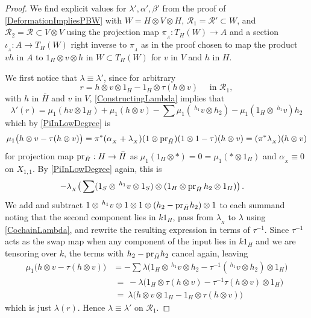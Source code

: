 \documentclass[11pt]{amsart}
\numberwithin{equation}{section}
\newcommand{\X}{_X}
\newcommand{\alphax}{\alpha_{\X}}
\newcommand{\lambdax}{\lambda_{\X}}
\newcommand{\pr}{ {\rm{pr}} }%
\newcommand{\R}{\mathcal{R}}
\newcommand{\RR}{\mathscr{R} }
\renewcommand{\_}[1]{\mbox{$_{\left( #1 \right)}$}}
\newcommand{\ot}{\otimes}
\begin{document}
{\begin{proof}
We find explicit values for $\lambda', \alpha', \beta'$
from the
proof of \cref{DeformationImpliesPBW}
with $W=H\ot V\ot H$, $\RR_1=\R'\subset W$,
and $\RR_2=\R\subset V\ot V$
using the projection map $\pi_{_A}:T_H(W)\rightarrow A$
and a section $\iota_{_A}: A\rightarrow T_H(W)$
right inverse to $\pi_{_A}$ as in the proof
chosen to map the product $vh$ in $A$ to $1_H\ot
v\ot h$ in $W\subset T_H(W)$
for $v$ in $V$ and $h$ in $H$.


We first notice that $\lambda\equiv \lambda'$, 
since for arbitrary
$$r=h\ot v\ot 1_H - 1_H\ot \tau(h\ot v) 
\quad\text{ in $\RR_1$},
$$
with $h$ in $\bar H$ and $v$ in $V$,
\cref{ConstructingLambda} 
implies that
$$\lambda'(r) = \mu_1(hv\ot 1_H)+\mu_1(h\ot v) 
-\sum \mu_1(\ ^{h_1}v\ot h_2)-\mu_1(1_H\ot \ ^{h_1}v)h_2$$
which by \cref{PiInLowDegree} is
$$
\begin{aligned}
\mu_1\big(h\ot v
-\tau(h\ot v)\big)
&=
\pi^*(\alphax+\lambdax)(1\ot \pr_{\bar H})(1\ot 1 - \tau)(h\ot v)
=
(\pi^* \lambdax)(h\ot v)\\
\end{aligned}
$$
for projection map $\pr_{\bar H}: H\rightarrow \bar H$
as $\mu_1(1_H\ot *)=0=\mu_1(*\ot 1_H)$
and $\alphax\equiv 0$ on $X_{1,1}$.
By \cref{PiInLowDegree} again, this is
$$
\begin{aligned}
  -\lambdax &\big(\sum (1_S\ot \, ^{h_1}v\ot 1_S)\ot (1_H\ot \pr_{\bar
    H} \, h_2\ot 
  1_H) \big)\, .
  \end{aligned}
  $$
We add and subtract 
$1\ot \, ^{h_1}v\ot 1\ot 1\ot (h_2-\pr_{\bar H} h_2)\ot 1$  to each summand
noting that the second component lies in $k1_H$,
pass from $\lambdax$ to $\lambda$ using \cref{CochainLambda},
 and rewrite the resulting expression in terms of 
 $\tau^{-1}$.  Since $\tau^{-1}$ acts as the swap map when
 any component of the input lies in $k1_H$ and we are tensoring over $k$,
  the terms with $h_2-\pr_{\bar H} h_2$ cancel again, leaving
 \begin{equation}\label{PiOnR'}
   \begin{aligned}
     \mu_1\big(h\ot v -\tau(h\ot v)\big)
     &=
         -\sum\lambda  \big(1_H\ot\, ^{h_1}v\ot h_2
      -\tau^{-1}(\, ^{h_1}v\ot h_2)\ot 1_H\big)
 \\  &\ =\
  -\lambda\big(1_H\ot \tau(h\ot v)-\tau^{-1} \tau(h \ot v)\ot 1_H\big)
\\ &\ =\
\lambda\big(h\ot v\ot 1_H-1_H\ot \tau(h\ot v)\big)
\end{aligned}
\end{equation}
which is just $\lambda(r)$.
Hence $\lambda\equiv \lambda'$ on $\RR_1$.


\end{proof}}
\end{document}
